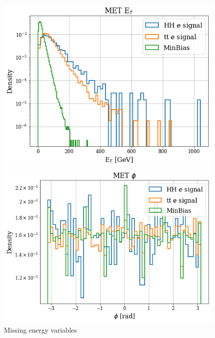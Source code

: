 \documentclass[../main.tex]{subfiles}
\begin{document}
\begin{figure}[t]
  \begin{minipage}[b]{0.5\linewidth}
    \centering
    \includegraphics[width=0.66\linewidth]{Chapters/Plots/Hist_1ele_met_Et.png}
  \end{minipage} %
  \begin{minipage}[b]{0.5\linewidth}
    \centering
    \includegraphics[width=0.66\linewidth]{Chapters/Plots/Hist_1ele_met_Phi.png}
  \end{minipage}
  \caption{Missing energy variables}
\end{figure}

\clearpage
\end{document}
